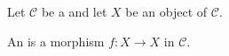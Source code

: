 \begin{definition} \label{definition:endomorphism_of_an_object_in_a_category}
    Let $\mathcal{C}$ be a  and let $X$ be an object of $\mathcal{C}$.

    An  is a morphism $f: X \to X$ in $\mathcal{C}$.
\end{definition}